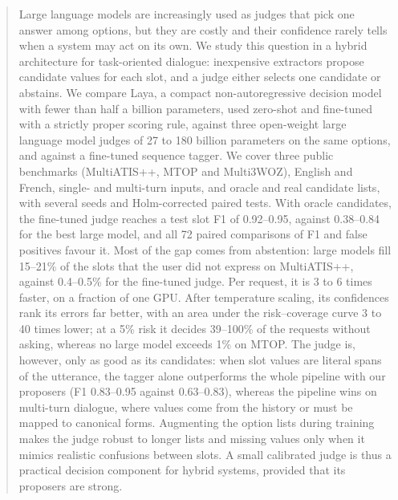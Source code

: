 \documentclass[a4paper,fleqn]{cas-sc}
\begin{document}
\begin{abstract}
Large language models are increasingly used as judges that pick one answer among options, but they are costly and their confidence rarely tells when a system may act on its own. We study this question in a hybrid architecture for task-oriented dialogue: inexpensive extractors propose candidate values for each slot, and a judge either selects one candidate or abstains. We compare Laya, a compact non-autoregressive decision model with fewer than half a billion parameters, used zero-shot and fine-tuned with a strictly proper scoring rule, against three open-weight large language model judges of 27 to 180 billion parameters on the same options, and against a fine-tuned sequence tagger. We cover three public benchmarks (MultiATIS++, MTOP and Multi3WOZ), English and French, single- and multi-turn inputs, and oracle and real candidate lists, with several seeds and Holm-corrected paired tests. With oracle candidates, the fine-tuned judge reaches a test slot F1 of 0.92--0.95, against 0.38--0.84 for the best large model, and all 72 paired comparisons of F1 and false positives favour it. Most of the gap comes from abstention: large models fill 15--21\% of the slots that the user did not express on MultiATIS++, against 0.4--0.5\% for the fine-tuned judge. Per request, it is 3 to 6 times faster, on a fraction of one GPU. After temperature scaling, its confidences rank its errors far better, with an area under the risk--coverage curve 3 to 40 times lower; at a 5\% risk it decides 39--100\% of the requests without asking, whereas no large model exceeds 1\% on MTOP. The judge is, however, only as good as its candidates: when slot values are literal spans of the utterance, the tagger alone outperforms the whole pipeline with our proposers (F1 0.83--0.95 against 0.63--0.83), whereas the pipeline wins on multi-turn dialogue, where values come from the history or must be mapped to canonical forms. Augmenting the option lists during training makes the judge robust to longer lists and missing values only when it mimics realistic confusions between slots. A small calibrated judge is thus a practical decision component for hybrid systems, provided that its proposers are strong.
\end{abstract}

\end{document}
